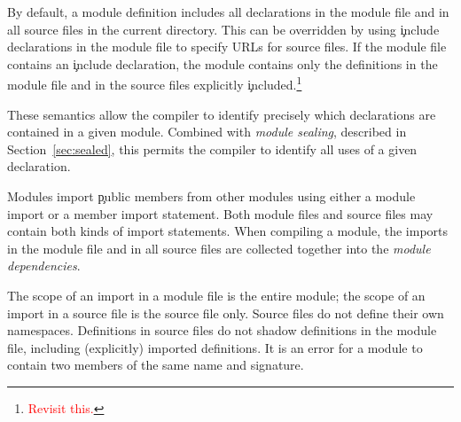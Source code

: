 \documentclass{article}
\newcommand\Secref[1]{Section~\ref{sec:#1}}
\newcommand\RED[1]{\textcolor{red}{#1}}
\newcommand\TODO[1]{\RED{#1}}
\begin{document}


By default, a module definition includes all declarations in the module
file and in all
source files in the current directory.  This can be overridden
by using \c{include} declarations in the module file to specify
URLs for source files.  If the module file contains an
\c{include} declaration, the module contains only the definitions in the
module file and in the source files 
explicitly \c{include}d.\footnote{\TODO{Revisit this.}}

These semantics allow the compiler to identify
precisely which declarations are contained in a given module.
Combined with \emph{module sealing}, described in
\Secref{sealed}, this permits the compiler to identify
all uses of a given declaration.

Modules import \c{public} members from other modules using
either a module import or a member import statement.
Both module files and source files 
may contain both kinds of import statements.
When compiling a module, the imports in the module file and in
all source files are collected together into the \emph{module
dependencies}.

The scope of an import in a module file is the
entire module; the scope of an import in a source file
is the source file only.
Source files do not define their own namespaces.
Definitions in source files do not shadow definitions in the
module file, including (explicitly) imported definitions.
It is an error for a module to contain two members of the same
name and signature.
\end{document}
